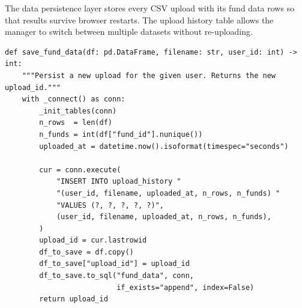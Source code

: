 \documentclass[12pt,a4paper]{report}
\begin{document}
The data persistence layer stores every CSV upload with its fund data rows so that results
survive browser restarts. The upload history table allows the manager to switch between
multiple datasets without re-uploading.

\begin{lstlisting}[style=pythonstyle, caption={Fund data persistence --- db.py}]
def save_fund_data(df: pd.DataFrame, filename: str, user_id: int) -> int:
    """Persist a new upload for the given user. Returns the new upload_id."""
    with _connect() as conn:
        _init_tables(conn)
        n_rows  = len(df)
        n_funds = int(df["fund_id"].nunique())
        uploaded_at = datetime.now().isoformat(timespec="seconds")

        cur = conn.execute(
            "INSERT INTO upload_history "
            "(user_id, filename, uploaded_at, n_rows, n_funds) "
            "VALUES (?, ?, ?, ?, ?)",
            (user_id, filename, uploaded_at, n_rows, n_funds),
        )
        upload_id = cur.lastrowid
        df_to_save = df.copy()
        df_to_save["upload_id"] = upload_id
        df_to_save.to_sql("fund_data", conn,
                          if_exists="append", index=False)
        return upload_id
\end{lstlisting}
\end{document}
